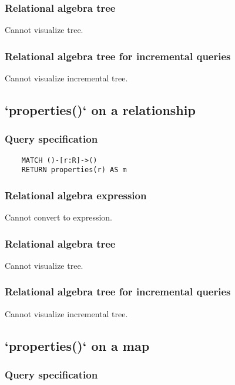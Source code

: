 	\subsubsection*{Relational algebra tree}

	Cannot visualize tree.

	\subsubsection*{Relational algebra tree for incremental queries}

	Cannot visualize incremental tree.
	\subsection{`properties()` on a relationship}

	\subsubsection*{Query specification}

	\begin{lstlisting}
	MATCH ()-[r:R]->()
	RETURN properties(r) AS m
	\end{lstlisting}


	\subsubsection*{Relational algebra expression}

	Cannot convert to expression.

	\subsubsection*{Relational algebra tree}

	Cannot visualize tree.

	\subsubsection*{Relational algebra tree for incremental queries}

	Cannot visualize incremental tree.
	\subsection{`properties()` on a map}

	\subsubsection*{Query specification}

